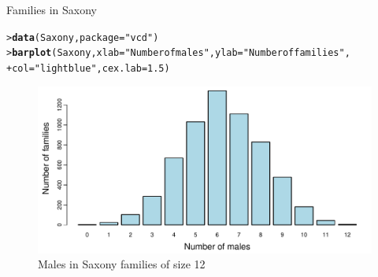 \documentclass[10pt,krantz2]{krantz}\usepackage[]{graphicx}\usepackage[]{color}
\makeatletter
\newcommand{\hlnum}[1]{\textcolor[rgb]{0.686,0.059,0.569}{#1}}%
\newcommand{\hlstr}[1]{\textcolor[rgb]{0.192,0.494,0.8}{#1}}%
\newcommand{\hlstd}[1]{\textcolor[rgb]{0.345,0.345,0.345}{#1}}%
\newcommand{\hlkwc}[1]{\textcolor[rgb]{0.333,0.667,0.333}{#1}}%
\newcommand{\hlkwd}[1]{\textcolor[rgb]{0.737,0.353,0.396}{\textbf{#1}}}%
\newenvironment{kframe}{%
 \def\at@end@of@kframe{}%
 \ifinner\ifhmode%
  \def\at@end@of@kframe{\end{minipage}}%
  \begin{minipage}{\columnwidth}%
 \fi\fi%
 \def\FrameCommand##1{\hskip\@totalleftmargin \hskip-\fboxsep
 \colorbox{shadecolor}{##1}\hskip-\fboxsep
     \hskip-\linewidth \hskip-\@totalleftmargin \hskip\columnwidth}%
 \MakeFramed {\advance\hsize-\width
   \@totalleftmargin\z@ \linewidth\hsize
   \@setminipage}}%
 {\par\unskip\endMakeFramed%
 \at@end@of@kframe}
\newenvironment{knitrout}{}{} %
\renewenvironment{knitrout}{\small\renewcommand{\baselinestretch}{.85}}{} %
\makeatother
\begin{document}
\begin{Example}[saxony1]{Families in Saxony}
\begin{knitrout}
\color{fgcolor}\begin{kframe}
\begin{alltt}
\hlstd{> }\hlkwd{data}\hlstd{(Saxony,} \hlkwc{package} \hlstd{=} \hlstr{"vcd"}\hlstd{)}
\hlstd{> }\hlkwd{barplot}\hlstd{(Saxony,} \hlkwc{xlab} \hlstd{=} \hlstr{"Number of males"}\hlstd{,} \hlkwc{ylab} \hlstd{=} \hlstr{"Number of families"}\hlstd{,}
\hlstd{+ }        \hlkwc{col} \hlstd{=} \hlstr{"lightblue"}\hlstd{,} \hlkwc{cex.lab} \hlstd{=} \hlnum{1.5}\hlstd{)}
\end{alltt}
\end{kframe}\begin{figure}[!htbp]

\centerline{\includegraphics[width=.75\textwidth]{ch03/fig/saxony-barplot-1} }

\caption[Males in Saxony families of size 12]{Males in Saxony families of size 12\label{fig:saxony-barplot}}
\end{figure}


\end{knitrout}
\end{Example}
\end{document}
